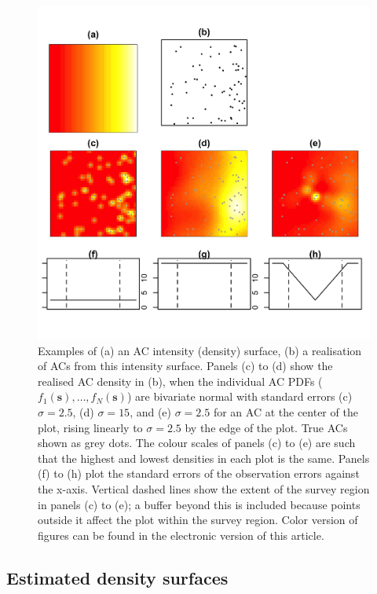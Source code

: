 \documentclass[useAMS,usenatbib,referee]{biom}
\begin{document}
\begin{figure}[htbp]
\centering
\includegraphics[width=\textwidth]{example-densities.jpg}
\caption{Examples of (a) an AC intensity (density) surface, (b) a realisation of ACs from this intensity surface. Panels (c) to (d) show the realised AC density in (b), when the individual AC PDFs ($f_1(\bm{s}),\ldots,f_N(\bm{s})$) are bivariate normal with standard errors (c) $\sigma=2.5$, (d) $\sigma=15$, and (e) $\sigma=2.5$ for an AC at the center of the plot, rising linearly to $\sigma=2.5$ by the edge of the plot. True ACs shown as grey dots. The colour scales of panels (c) to (e) are such that the highest and lowest densities in each plot is the same. Panels (f) to (h) plot the standard errors of the observation errors against the x-axis. Vertical dashed lines show the extent of the survey region in panels (c) to (e); a buffer beyond this is included because points outside it affect the plot within the survey region. Color version of figures can be found in the electronic version of this article.}
\label{fig:densities}
\end{figure}

\subsection{Estimated density surfaces}
\end{document}

